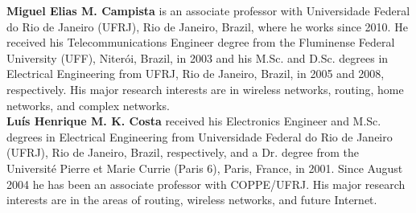 \noindent
\textbf{Miguel Elias M. Campista} is an associate professor with Universidade Federal do Rio de Janeiro (UFRJ), Rio de Janeiro, Brazil, where he works since 2010. He received his Telecommunications Engineer degree from the Fluminense Federal University (UFF), Niter{\'o}i, Brazil, in 2003 and his M.Sc. and D.Sc. degrees in Electrical Engineering from UFRJ, Rio de Janeiro, Brazil, in 2005 and 2008, respectively. His major research interests are in wireless networks, routing, home networks, and complex networks.\\

\noindent
\textbf{Lu\'is Henrique M. K. Costa} received his Electronics Engineer and M.Sc. degrees in Electrical Engineering from Universidade Federal do Rio de Janeiro (UFRJ), Rio de Janeiro, Brazil, respectively, and a Dr. degree from the Universit\'e Pierre et Marie Currie (Paris 6), Paris, France, in 2001. Since August 2004 he has been an associate professor with COPPE/UFRJ. His major research interests are in the areas of routing, wireless networks, and future Internet. 




